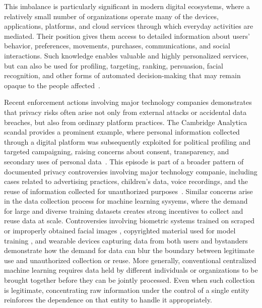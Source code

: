 This imbalance is particularly significant in modern digital ecosystems, where a relatively small number of organizations operate many of the devices, applications, platforms, and cloud services through which everyday activities are mediated. Their position gives them access to detailed information about users' behavior, preferences, movements, purchases, communications, and social interactions. Such knowledge enables valuable and highly personalized services, but can also be used for profiling, targeting, ranking, persuasion, facial recognition, and other forms of automated decision-making that may remain opaque to the people affected~\cite{pasquale_black_box_society_2015,veliz_privacy_is_power_2021}. 


 Recent enforcement actions involving major technology companies demonstrates that privacy risks often arise not only from external attacks or accidental data breaches, but also from ordinary platform practices.
The Cambridge Analytica scandal provides a prominent example, where personal information collected through a digital platform was subsequently exploited for political profiling and targeted campaigning, raising concerns about consent, transparency, and secondary uses of personal data~\cite{ico_democracy_disrupted_2018,ico_data_analytics_political_campaigns_2018}. This episode is part of a broader pattern of documented privacy controversies involving major technology companie, including cases related to advertising practices, children's data, voice recordings, and the reuse of information collected for unauthorized purposes~\cite{cnil_google_gdpr_2019,ftc_youtube_coppa_2019,ftc_twitter_security_data_ads_2022,ftc_amazon_alexa_coppa_2023,texas_ag_google_privacy_2025}. 
Similar concerns arise in the data collection process for machine learning sysyems, where the demand for large and diverse training datasets creates strong incentives to collect and reuse data at scale. Controversies involving biometric systems trained on scraped or improperly obtained facial images , copyrighted material used for model training , and wearable devices capturing data from both users and bystanders  demonstrate how the demand for data can blur the boundary between legitimate use and unauthorized collection or reuse.  More generally, conventional centralized machine learning requires data held by different individuals or organizations to be brought together before they can be jointly processed. Even when such collection is legitimate, concentrating raw information under the control of a single entity reinforces the dependence on that entity to handle it appropriately.

